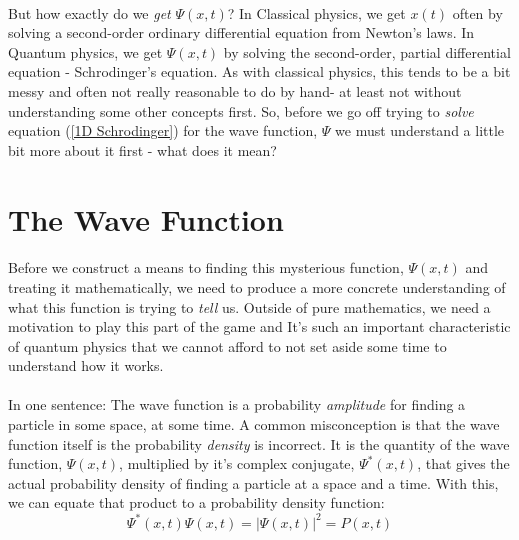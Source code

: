 \documentclass[12pt,letterpaper]{book}
\begin{document}
\paragraph*{}But how exactly do we \textit{get} $\Psi(x,t)$? In Classical physics, we get $x(t)$ often by solving a second-order ordinary differential equation from Newton's laws. In Quantum physics, we get $\Psi(x,t)$ by solving the second-order, partial differential equation - Schrodinger's equation. As with classical physics, this tends to be a bit messy and often not really reasonable to do by hand- at least not without understanding some other concepts first. So, before we go off trying to \textit{solve} equation (\ref{1D Schrodinger}) for the wave function, $\Psi$ we must understand a little bit more about it first - what does it mean?



\section{The Wave Function}

\paragraph*{}Before we construct a means to finding this mysterious function, $\Psi(x,t)$ and treating it mathematically, we need to produce a more concrete understanding of what this function is trying to \textit{tell} us. Outside of pure mathematics, we need a motivation to play this part of the game and It's such an important characteristic of quantum physics that we cannot afford to not set aside some time to understand how it works.
\paragraph*{}In one sentence: The wave function is a probability \textit{amplitude} for finding a particle in some space, at some time. A common misconception is that the wave function itself is the probability \textit{density} is incorrect. It is the quantity of the wave function, $\Psi(x,t)$, multiplied by it's complex conjugate, $\Psi^*(x,t)$, that gives the actual probability density of finding a particle at a space and a time. With this, we can equate that product to a probability density function:
\begin{equation}
\label{prob density func}
\Psi^*(x,t) \Psi(x,t) = \big | \Psi(x,t) \big|^2 = P(x,t)
\end{equation}
\end{document}
